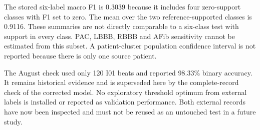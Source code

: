 The stored six-label macro F1 is 0.3039 because it includes four zero-support
classes with F1 set to zero. The mean over the two reference-supported
classes is 0.9116. These summaries are not directly comparable to a six-class
test with support in every class. PAC, LBBB, RBBB and AFib sensitivity cannot
be estimated from this subset. A patient-cluster population confidence
interval is not reported because there is only one source patient.

The August check used only 120 I01 beats and reported 98.33\% binary
accuracy. It remains historical evidence and is superseded here by the
complete-record check of the corrected model. No exploratory threshold
optimum from external labels is installed or reported as validation performance.
Both external records have now been inspected and must not be reused as an
untouched test in a future study.
